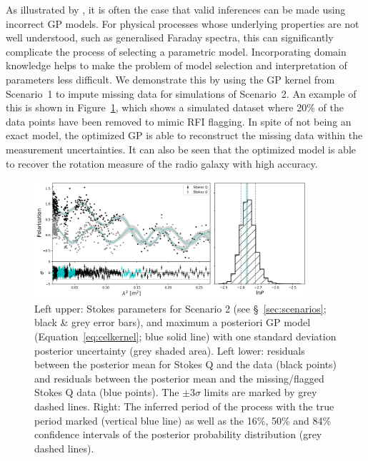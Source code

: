 \documentclass[fleqn,usenatbib]{mnras}
\begin{document}
As illustrated by \cite{celerite}, it is often the case that valid inferences can be made using incorrect GP models. For physical processes whose underlying properties are not well understood, such as generalised Faraday spectra, this can significantly complicate the process of selecting a parametric model. Incorporating domain knowledge helps to make the problem of model selection and interpretation of parameters less difficult. We demonstrate this by using the GP kernel from Scenario~1 to impute missing data for simulations of Scenario~2. An example of this is shown in Figure~\ref{fig:scenario2}, which shows a simulated dataset where 20\% of the data points have been removed to mimic RFI flagging. In spite of not being an exact model, the optimized GP is able to reconstruct the missing data within the measurement uncertainties. It can also be seen that the optimized model is able to recover the rotation measure of the radio galaxy with high accuracy.
%
\begin{figure}
\includegraphics[width=0.9\textwidth]{./FIGURES/diff_case2_minus30_n0p2.png}
\caption{\label{fig:scenario2} Left upper: Stokes parameters for Scenario 2 (see \S~\ref{sec:scenarios}; black \& grey error bars), and maximum a posteriori GP model (Equation~\ref{eq:celkernel}; blue solid line) with one standard deviation posterior uncertainty (grey shaded area). Left lower: residuals between the posterior mean for Stokes Q and the data (black points) and residuals between the posterior mean and the missing/flagged Stokes Q data (blue points). The $\pm3\sigma$ limits are marked by grey dashed lines. Right: The inferred period of the process with the true period marked (vertical blue line) as well as the 16\%, 50\% and 84\% confidence intervals of the posterior probability distribution (grey dashed lines).}
\end{figure}
\end{document}
